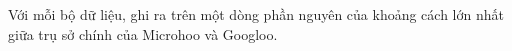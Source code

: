 Với mỗi bộ dữ liệu, ghi ra trên một dòng phần nguyên của khoảng cách lớn nhất giữa trụ sở chính của Microhoo và Googloo.